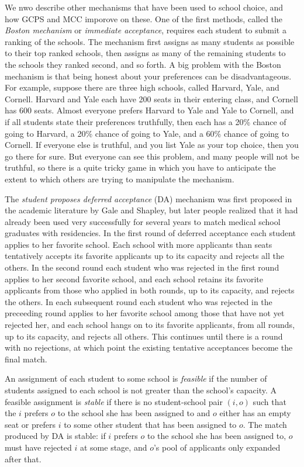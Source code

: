 \documentclass[12pt]{article}
\theoremstyle{definition}
\begin{document}
We nwo describe other mechanisms that have been used to school choice,
and how GCPS and MCC imporove on these.  One of the first methods,
called the \emph{Boston mechanism} or \emph{immediate acceptance},
requires each student to submit a ranking of the schools.  The
mechanism first assigns as many students as possible to their top
ranked schools, then assigns as many of the remaining students to the
schools they ranked second, and so forth. A big problem with the
Boston mechanism is that being honest about your preferences can be
disadvantageous.  For example, suppose there are three high schools,
called Harvard, Yale, and Cornell.  Harvard and Yale each have 200
seats in their entering class, and Cornell has 600 seats.  Almost
everyone prefers Harvard to Yale and Yale to Cornell, and if all
students state their preferences truthfully, then each has a 20\%
chance of going to Harvard, a 20\% chance of going to Yale, and a 60\%
chance of going to Cornell.  If everyone else is truthful, and you
list Yale as your top choice, then you go there for sure.  But
everyone can see this problem, and many people will not be truthful,
so there is a quite tricky game in which you have to anticipate the
extent to which others are trying to manipulate the mechanism.

The \emph{student proposes deferred acceptance} (DA) mechanism was
first proposed in the academic literature by Gale and Shapley, but
later people realized that it had already been used very successfully
for several years to match medical school graduates with residencies.
In the first round of deferred acceptance each student applies to her
favorite school.  Each school with more applicants than seats
tentatively accepts its favorite applicants up to its capacity and
rejects all the others.  In the second round each student who was
rejected in the first round applies to her second favorite school, and
each school retains its favorite applicants from those who applied in
both rounds, up to its capacity, and rejects the others.  In each
subsequent round each student who was rejected in the preceeding round
applies to her favorite school among those that have not yet rejected
her, and each school hangs on to its favorite applicants, from all
rounds, up to its capacity, and rejects all others.  This continues
until there is a round with no rejections, at which point the existing
tentative acceptances become the final match.

An assignment of each student to some school is \emph{feasible} if the
number of students assigned to each school is not greater than the
school's capacity.  A feasible assignment is \emph{stable} if there is
no student-school pair $(i,o)$ such that the $i$ prefers $o$ to the
school she has been assigned to and $o$ either has an empty seat or
prefers $i$ to some other student that has been assigned to $o$.  The
match produced by DA is stable: if $i$ prefers $o$ to the school she
has been assigned to, $o$ must have rejected $i$ at some stage, and
$o$'s pool of applicants only expanded after that.
\end{document}
